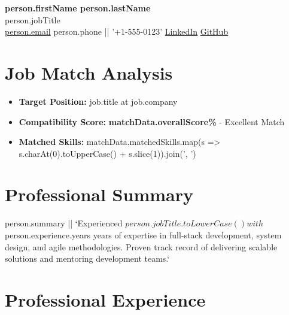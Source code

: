 \documentclass[11pt,letterpaper]{article}
\begin{document}
\begin{center}
    {\Huge\bfseries\color{headercolor} {{person.firstName}} {{person.lastName}}} \\[0.3em]
    {\Large {{person.jobTitle}}} \\[0.5em]
     \href{mailto:{{person.email}}}{{{person.email}}} \quad
     {{person.phone || '+1-555-0123'}} \quad
     \href{https://linkedin.com/in/{{person.linkedin || 'alexmartinez'}}}{LinkedIn} \quad
     \href{https://github.com/{{person.github || 'alexmartinez'}}}{GitHub}
\end{center}

\vspace{0.5em}

\section{Job Match Analysis}
\begin{itemize}[leftmargin=*,labelsep=0.5em]
    \item \textbf{Target Position:} {{job.title}} at {{job.company}}
    \item \textbf{Compatibility Score:} \textcolor{accentcolor}{\textbf{{{matchData.overallScore}}\%}} - Excellent Match
    \item \textbf{Matched Skills:} {{matchData.matchedSkills.map(s => s.charAt(0).toUpperCase() + s.slice(1)).join(', ')}}
\end{itemize}

\section{Professional Summary}
{{person.summary || `Experienced ${person.jobTitle.toLowerCase()} with ${person.experience.years} years of expertise in full-stack development, system design, and agile methodologies. Proven track record of delivering scalable solutions and mentoring development teams.`}}

\section{Professional Experience}
\end{document}
